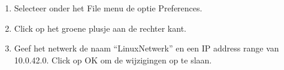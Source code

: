 
\begin{enumerate}
	\item Selecteer onder het File menu de optie Preferences.
	\item
		\begin{minipage}[t]{\linewidth}
		\raggedright
		Click op het groene plusje aan de rechter kant.
		\end{minipage}

	\item
		\begin{minipage}[t]{\linewidth}
		\raggedright
		Geef het netwerk de naam ``LinuxNetwerk'' en een IP address range van 10.0.42.0. Click op OK om de wijzigingen op te slaan.
		\end{minipage}
\end{enumerate}

